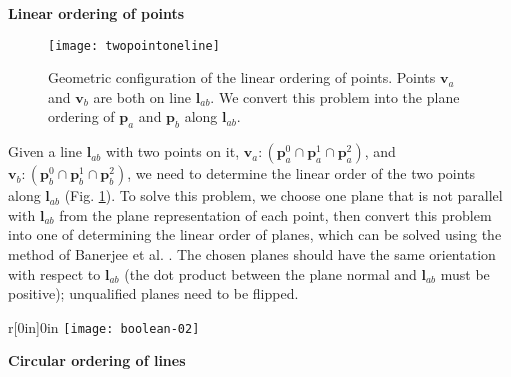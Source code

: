 \vspace{0.5em}
\noindent \textbf{Linear ordering of points}

\begin{figure}
  \centering
  \texttt{[image: twopointoneline]}\\
  \caption{Geometric configuration of the linear ordering of points. Points $\bm{v}_a$ and $\bm{v}_b$ are both on line $\bm{l}_{ab}$. We convert this problem into the plane ordering of $\bm{p}_a$ and $\bm{p}_b$ along $\bm{l}_{ab}$.}\label{fig:twopointoneline}
\end{figure}



\noindent Given a line $\bm{l}_{ab}$ with two points on it, $\bm{v}_a\colon(\bm{p}_a^0\cap\bm{p}_a^1\cap\bm{p}_a^2)$, and $\bm{v}_b\colon(\bm{p}_b^0\cap\bm{p}_b^1\cap\bm{p}_b^2)$, we need to determine the linear order of the two points along $\bm{l}_{ab}$ (Fig. \ref{fig:twopointoneline}). To solve this problem, we choose one plane that is not parallel with $\bm{l}_{ab}$ from the plane representation of each point, then convert this problem into one of determining the linear order of planes, which can be solved using the method of Banerjee et al. \cite{banerjee1996topologically}. The chosen planes should have the same orientation with respect to $\bm{l}_{ab}$ (the dot product between the plane normal and $\bm{l}_{ab}$ must be positive); unqualified planes need to be flipped.


\begin{wrapfigure}{r}[0in]{0in}
\texttt{[image: boolean-02]}
\end{wrapfigure}
\vspace{0.5em}
\noindent \textbf{Circular ordering of lines}~~~~

